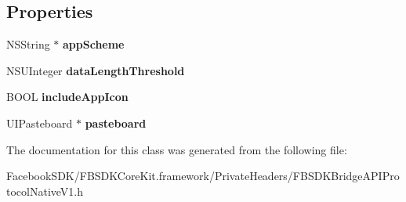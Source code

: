 \subsection*{Properties}
\begin{DoxyCompactItemize}
\item 
\hypertarget{interface_f_b_s_d_k_bridge_a_p_i_protocol_native_v1_a77f2b9a40926ffb04fc38e35d9204cb2}{N\-S\-String $\ast$ {\bfseries app\-Scheme}}\label{interface_f_b_s_d_k_bridge_a_p_i_protocol_native_v1_a77f2b9a40926ffb04fc38e35d9204cb2}

\item 
\hypertarget{interface_f_b_s_d_k_bridge_a_p_i_protocol_native_v1_a24fe04889056ce7f758d318b3daebe2d}{N\-S\-U\-Integer {\bfseries data\-Length\-Threshold}}\label{interface_f_b_s_d_k_bridge_a_p_i_protocol_native_v1_a24fe04889056ce7f758d318b3daebe2d}

\item 
\hypertarget{interface_f_b_s_d_k_bridge_a_p_i_protocol_native_v1_ad274e5787e60b874b1968e0ddfad4274}{B\-O\-O\-L {\bfseries include\-App\-Icon}}\label{interface_f_b_s_d_k_bridge_a_p_i_protocol_native_v1_ad274e5787e60b874b1968e0ddfad4274}

\item 
\hypertarget{interface_f_b_s_d_k_bridge_a_p_i_protocol_native_v1_a58ffa0f2744ae3abc29c6802ef5549b4}{U\-I\-Pasteboard $\ast$ {\bfseries pasteboard}}\label{interface_f_b_s_d_k_bridge_a_p_i_protocol_native_v1_a58ffa0f2744ae3abc29c6802ef5549b4}

\end{DoxyCompactItemize}


The documentation for this class was generated from the following file\-:\begin{DoxyCompactItemize}
\item 
Facebook\-S\-D\-K/\-F\-B\-S\-D\-K\-Core\-Kit.\-framework/\-Private\-Headers/F\-B\-S\-D\-K\-Bridge\-A\-P\-I\-Protocol\-Native\-V1.\-h\end{DoxyCompactItemize}
